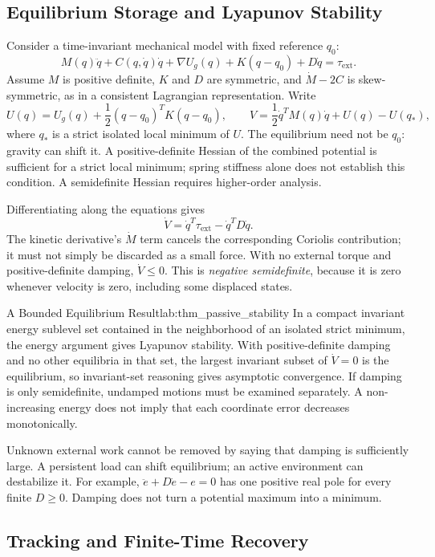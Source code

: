 \subsection{Equilibrium Storage and Lyapunov Stability}
\label{subsec:lyapunov}

Consider a time-invariant mechanical model with fixed reference $q_0$:
\[
M(q)\ddot q+C(q,\dot q)\dot q+\nabla U_g(q)+K(q-q_0)+D\dot q
=\tau_{\mathrm{ext}}.
\]
Assume $M$ is positive definite, $K$ and $D$ are symmetric, and $\dot M-2C$ is skew-symmetric, as in a consistent Lagrangian representation. Write
\[
U(q)=U_g(q)+\frac12(q-q_0)^TK(q-q_0),\qquad
V=\frac12\dot q^TM(q)\dot q+U(q)-U(q_*),
\]
where $q_*$ is a strict isolated local minimum of $U$. The equilibrium need not be $q_0$: gravity can shift it. A positive-definite Hessian of the combined potential is sufficient for a strict local minimum; spring stiffness alone does not establish this condition. A semidefinite Hessian requires higher-order analysis.

Differentiating along the equations gives
\[
\dot V=\dot q^T\tau_{\mathrm{ext}}-\dot q^TD\dot q.
\]
The kinetic derivative's $\dot M$ term cancels the corresponding Coriolis contribution; it must not simply be discarded as a small force. With no external torque and positive-definite damping, $\dot V\leq0$. This is \emph{negative semidefinite}, because it is zero whenever velocity is zero, including some displaced states.

\begin{principle}{A Bounded Equilibrium Result}{lab:thm_passive_stability}
In a compact invariant energy sublevel set contained in the neighborhood of an isolated strict minimum, the energy argument gives Lyapunov stability. With positive-definite damping and no other equilibria in that set, the largest invariant subset of $\dot V=0$ is the equilibrium, so invariant-set reasoning gives asymptotic convergence. If damping is only semidefinite, undamped motions must be examined separately. A non-increasing energy does not imply that each coordinate error decreases monotonically.
\end{principle}

Unknown external work cannot be removed by saying that damping is sufficiently large. A persistent load can shift equilibrium; an active environment can destabilize it. For example, $\ddot e+D\dot e-e=0$ has one positive real pole for every finite $D\geq0$. Damping does not turn a potential maximum into a minimum.

\subsection{Tracking and Finite-Time Recovery}
\label{subsec:self_correction}

